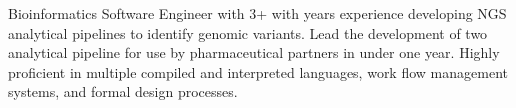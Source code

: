 

\begin{cvparagraph}

Bioinformatics Software Engineer with 3+ with years experience developing NGS analytical pipelines to identify genomic variants. Lead the development of two analytical pipeline for use by pharmaceutical partners in under one year. Highly proficient in multiple compiled and interpreted languages, work flow management systems, and formal design processes.
\end{cvparagraph}
